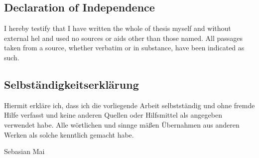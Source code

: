 
\subsection*{ Declaration of Independence }

I hereby testify that I have written the whole of thesis myself and without external hel and used no sources or aids other than those named.
All passages taken from a source, whether verbatim or in substance, have been indicated as such.


\subsection*{Selbständigkeitserklärung}
Hiermit erkläre ich, dass ich die vorliegende Arbeit selbstständig und ohne fremde Hilfe
verfasst und keine anderen Quellen oder Hilfsmittel als angegeben verwendet habe. 
Alle wörtlichen und sinnge mäßen Übernahmen aus anderen Werken
als solche kenntlich gemacht habe. 


Sebasian Mai

